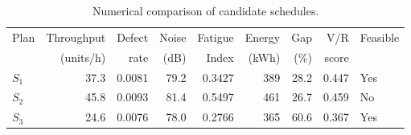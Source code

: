 \begin{table}[htbp]
\centering
\caption{Numerical comparison of candidate schedules.}
\label{tab:numerical-sim}
\small
\begin{tabular}{@{}lrrrrrrrl@{}}
\toprule
Plan & Throughput & Defect & Noise & Fatigue & Energy & Gap & V/R & Feasible \\
     & (units/h)  & rate   & (dB)  & Index   & (kWh)  & (\%) & score &         \\
\midrule
$S_{1}$ & 37.3 & 0.0081 & 79.2 & 0.3427 & 389 & 28.2 & 0.447 & Yes \\
$S_{2}$ & 45.8 & 0.0093 & 81.4 & 0.5497 & 461 & 26.7 & 0.459 & No \\
$S_{3}$ & 24.6 & 0.0076 & 78.0 & 0.2766 & 365 & 60.6 & 0.367 & Yes \\
\bottomrule
\end{tabular}
\end{table}
